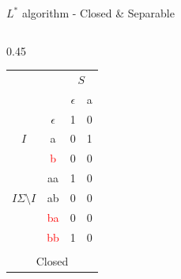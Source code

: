 \documentclass{beamer}
\begin{document}
\begin{frame}{$L^*$ algorithm - Closed \&  Separable}
\begin{columns}[T,onlytextwidth]
        \begin{column}{0.45\textwidth} 
            \centering
            \begin{tabular}{cc|c|c}
                &   & \multicolumn{2}{c}{$S$} \\ 
                \multicolumn{2}{c|}{} & $\epsilon$ & a \\ \hline
                & $\epsilon$ & 1 & 0 \\
                {$I$}& a          & 0 & 1 \\
                & \textcolor{red}{b}          & 0 & 0 \\\hline
                & aa& 1& 0 \\
                {$I\Sigma\setminus I$}        & ab& 0&0\\
                & \textcolor{red}{ba}         & 0 & 0 \\
                & \textcolor{red}{bb}           & 1 & 0 \\ 
                \multicolumn{4}{c}{} \\[-0.8em] 
                \multicolumn{4}{c}{\footnotesize Closed}
            \end{tabular}
        \end{column}
    \end{columns}
\end{frame}
\end{document}
